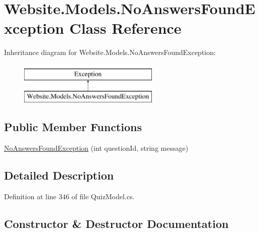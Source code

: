 \hypertarget{class_website_1_1_models_1_1_no_answers_found_exception}{}\section{Website.\+Models.\+No\+Answers\+Found\+Exception Class Reference}
\label{class_website_1_1_models_1_1_no_answers_found_exception}
Inheritance diagram for Website.\+Models.\+No\+Answers\+Found\+Exception\+:\begin{figure}[H]
\begin{center}
\leavevmode
\includegraphics[height=2.000000cm]{class_website_1_1_models_1_1_no_answers_found_exception}
\end{center}
\end{figure}
\subsection*{Public Member Functions}
\begin{DoxyCompactItemize}
\item 
\hyperlink{class_website_1_1_models_1_1_no_answers_found_exception_a7026759ca9e8fab344a076424d8a323b}{No\+Answers\+Found\+Exception} (int question\+Id, string message)
\end{DoxyCompactItemize}


\subsection{Detailed Description}


Definition at line 346 of file Quiz\+Model.\+cs.



\subsection{Constructor \& Destructor Documentation}
\hypertarget{class_website_1_1_models_1_1_no_answers_found_exception_a7026759ca9e8fab344a076424d8a323b}{}

